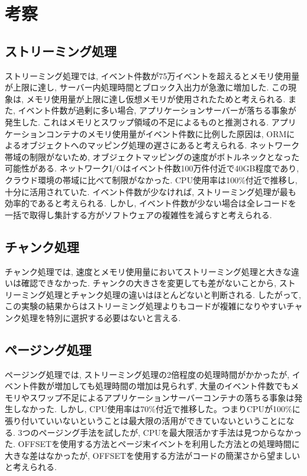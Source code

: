 \documentclass[../../main]{subfiles}
\begin{document}
    \section{考察}\label{sec:consideration}

    \subsection{ストリーミング処理}\label{subsec:consideration-streaming}

    ストリーミング処理では, イベント件数が75万イベントを超えるとメモリ使用量が上限に達し, サーバー内処理時間とブロック入出力が急激に増加した. この現象は, メモリ使用量が上限に達し仮想メモリが使用されたためと考えられる. また, イベント件数が過剰に多い場合, アプリケーションサーバーが落ちる事象が発生した. これはメモリとスワップ領域の不足によるものと推測される. アプリケーションコンテナのメモリ使用量がイベント件数に比例した原因は, ORMによるオブジェクトへのマッピング処理の遅さにあると考えられる. ネットワーク帯域の制限がないため, オブジェクトマッピングの速度がボトルネックとなった可能性がある. ネットワークI/Oはイベント件数100万件付近で40GB程度であり, クラウド環境の帯域に比べて制限がなかった. CPU使用率は100\%付近で推移し, 十分に活用されていた. イベント件数が少なければ, ストリーミング処理が最も効率的であると考えられる. しかし, イベント件数が少ない場合は全レコードを一括で取得し集計する方がソフトウェアの複雑性を減らすと考えられる.

    \subsection{チャンク処理}\label{subsec:consideration-chunk}

    チャンク処理では, 速度とメモリ使用量においてストリーミング処理と大きな違いは確認できなかった. チャンクの大きさを変更しても差がないことから, ストリーミング処理とチャンク処理の違いはほとんどないと判断される. したがって, この実験の結果からはストリーミング処理よりもコードが複雑になりやすいチャンク処理を特別に選択する必要はないと言える.

    \subsection{ページング処理}\label{subsec:consideration-paging}

    ページング処理では, ストリーミング処理の2倍程度の処理時間がかかったが, イベント件数が増加しても処理時間の増加は見られず, 大量のイベント件数でもメモリやスワップ不足によるアプリケーションサーバーコンテナの落ちる事象は発生しなかった. しかし, CPU使用率は70\%付近で推移した。つまりCPUが100\%に張り付いていいないということは最大限の活用ができていないということになる. 3つのページング手法を試したが, CPUを最大限活かす手法は見つからなかった. OFFSETを使用する方法とページ末イベントを利用した方法との処理時間に大きな差はなかったが, OFFSETを使用する方法がコードの簡潔さから望ましいと考えられる.
\end{document}
